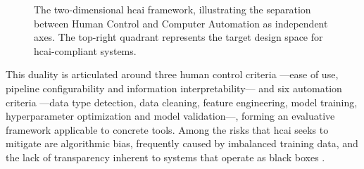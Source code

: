 \documentclass[a4paper,twoside]{article}
\begin{document}
\begin{figure}[!htbp]
\caption{The two-dimensional \gls{hcai} framework, illustrating the separation
between Human Control and Computer Automation as independent axes. The
top-right quadrant represents the target design space for \gls{hcai}-compliant
systems.}
\label{fig:HCAI_dimensions}
\centering
{}
\end{figure}

This duality is articulated around three human control criteria ---ease of use, pipeline configurability and information interpretability--- and six automation criteria ---data type detection, data cleaning, feature engineering, model training, hyperparameter optimization and model validation---, forming an evaluative framework applicable to concrete tools. Among the risks that \gls{hcai} seeks to mitigate are algorithmic bias, frequently caused by imbalanced training data, and the lack of transparency inherent to systems that operate as black boxes \cite{chen2023human}.
\end{document}
